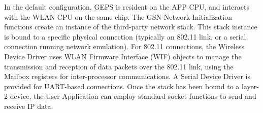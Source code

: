 In the default configuration, GEPS is resident on the APP CPU, and interacts with the WLAN CPU on the same chip. The GSN Network Initialization functions create an instance of the third-\/party network stack. This stack instance is bound to a specific physical connection (typically an 802.11 link, or a serial connection running network emulation). For 802.11 connections, the Wireless Device Driver uses WLAN Firmware Interface (WIF) objects to manage the transmission and reception of data packets over the 802.11 link, using the Mailbox registers for inter-\/processor communications. A Serial Device Driver is provided for UART-\/based connections. Once the stack has been bound to a layer-\/2 device, the User Application can employ standard socket functions to send and receive IP data.



 